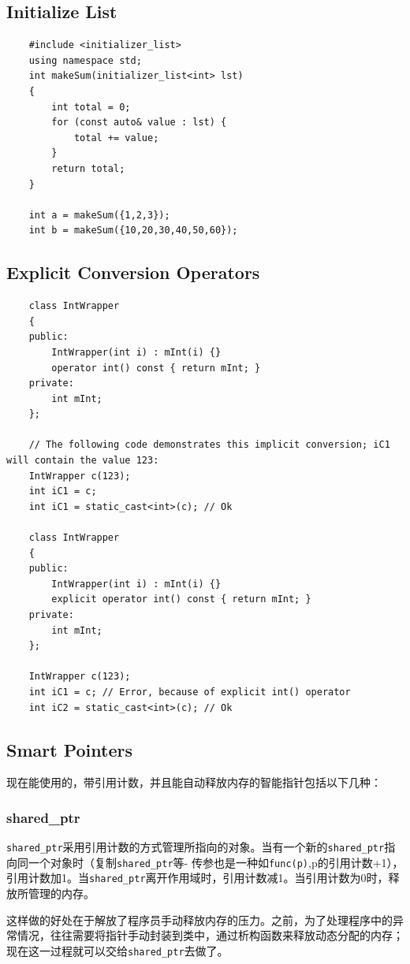 \documentclass[UTF8,a4paper,12pt]{ctexbook} %
\begin{document}
		\subsection{Initialize List}
			\begin{lstlisting}
	#include <initializer_list>
	using namespace std;
	int makeSum(initializer_list<int> lst)
	{
		int total = 0;
		for (const auto& value : lst) {
			total += value;
		}
		return total;
	}
	
	int a = makeSum({1,2,3});
	int b = makeSum({10,20,30,40,50,60});
			\end{lstlisting}
		\subsection{Explicit Conversion Operators}
			\begin{lstlisting}
	class IntWrapper
	{
	public:
		IntWrapper(int i) : mInt(i) {}
		operator int() const { return mInt; }
	private:
		int mInt;
	};
	
	// The following code demonstrates this implicit conversion; iC1 will contain the value 123:
	IntWrapper c(123);
	int iC1 = c;
	int iC1 = static_cast<int>(c); // Ok
	
	class IntWrapper
	{
	public:
		IntWrapper(int i) : mInt(i) {}
		explicit operator int() const { return mInt; }
	private:
		int mInt;
	};
	
	IntWrapper c(123);
	int iC1 = c; // Error, because of explicit int() operator
	int iC2 = static_cast<int>(c); // Ok
			\end{lstlisting}
		
		\subsection{Smart Pointers}
			现在能使用的，带引用计数，并且能自动释放内存的智能指针包括以下几种：
			\subsubsection{shared\_ptr}
				\verb|shared_ptr|采用引用计数的方式管理所指向的对象。当有一个新的\verb|shared_ptr|指向同一个对象时（复制\verb|shared_ptr|等- 传参也是一种如\verb|func(p)|,p的引用计数+1），引用计数加1。当\verb|shared_ptr|离开作用域时，引用计数减1。当引用计数为0时，释放所管理的内存。
					
				这样做的好处在于解放了程序员手动释放内存的压力。之前，为了处理程序中的异常情况，往往需要将指针手动封装到类中，通过析构函数来释放动态分配的内存；现在这一过程就可以交给\verb|shared_ptr|去做了。
				
\end{document}
